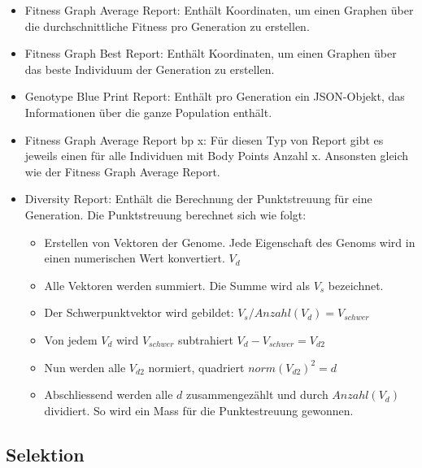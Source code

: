       \begin{itemize}

        \item Fitness Graph Average Report: Enthält Koordinaten,
          um einen Graphen über die durchschnittliche Fitness pro Generation zu erstellen.

        \item Fitness Graph Best Report: Enthält Koordinaten,
          um einen Graphen über das beste Individuum der Generation zu erstellen.

        \item Genotype Blue Print Report: Enthält pro Generation ein \gls{JSON}-Objekt,
          das Informationen über die ganze Population enthält.

        \item Fitness Graph Average Report bp x: Für diesen Typ von Report gibt es jeweils einen für alle Individuen mit Body Points Anzahl x.
              Ansonsten gleich wie der Fitness Graph Average Report.

        \item Diversity Report: Enthält die Berechnung der Punktstreuung für eine Generation.
          Die Punktstreuung berechnet sich wie folgt:

        \begin{itemize}
          \item Erstellen von Vektoren der Genome. Jede Eigenschaft des Genoms wird in einen numerischen Wert konvertiert. \( V_d \)
          \item Alle Vektoren werden summiert. Die Summe wird als \(V_s\) bezeichnet.
          \item Der Schwerpunktvektor wird gebildet: \( V_s / Anzahl(V_d) = V_{schwer} \)
          \item Von jedem \(V_d\) wird \(V_{schwer}\) subtrahiert  \( V_d - V_{schwer}  = V_{d2} \)
          \item Nun werden alle \(V_{d2}\) normiert, quadriert \( norm{(V_{d2})}^2 = d \)
          \item Abschliessend werden alle \(d\) zusammengezählt und durch \(Anzahl(V_d)\) dividiert. So wird ein Mass für die Punktestreuung gewonnen.
        \end{itemize}
      \end{itemize}

    \subsection{Selektion\label{sec:Selektion}}


